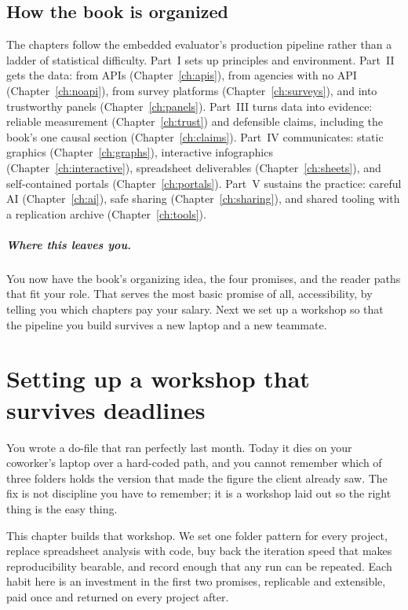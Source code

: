 \documentclass[
    a4paper,
    fontsize=10pt,
    twoside=true,
    numbers=noenddot,
]{kaobook}
\begin{document}
\section{How the book is organized}
The chapters follow the embedded evaluator's production pipeline rather than a ladder of statistical difficulty. Part~I sets up principles and environment. Part~II gets the data: from APIs (Chapter~\ref{ch:apis}), from agencies with no API (Chapter~\ref{ch:noapi}), from survey platforms (Chapter~\ref{ch:surveys}), and into trustworthy panels (Chapter~\ref{ch:panels}). Part~III turns data into evidence: reliable measurement (Chapter~\ref{ch:trust}) and defensible claims, including the book's one causal section (Chapter~\ref{ch:claims}). Part~IV communicates: static graphics (Chapter~\ref{ch:graphs}), interactive infographics (Chapter~\ref{ch:interactive}), spreadsheet deliverables (Chapter~\ref{ch:sheets}), and self-contained portals (Chapter~\ref{ch:portals}). Part~V sustains the practice: careful AI (Chapter~\ref{ch:ai}), safe sharing (Chapter~\ref{ch:sharing}), and shared tooling with a replication archive (Chapter~\ref{ch:tools}).

\paragraph{Where this leaves you.} You now have the book's organizing idea, the four promises, and the reader paths that fit your role. That serves the most basic promise of all, accessibility, by telling you which chapters pay your salary. Next we set up a workshop so that the pipeline you build survives a new laptop and a new teammate.

\chapter{Setting up a workshop that survives deadlines}\label{ch:workshop}

You wrote a do-file that ran perfectly last month. Today it dies on your coworker's laptop over a hard-coded path, and you cannot remember which of three folders holds the version that made the figure the client already saw. The fix is not discipline you have to remember; it is a workshop laid out so the right thing is the easy thing.

This chapter builds that workshop. We set one folder pattern for every project, replace spreadsheet analysis with code, buy back the iteration speed that makes reproducibility bearable, and record enough that any run can be repeated. Each habit here is an investment in the first two promises, replicable and extensible, paid once and returned on every project after.
\end{document}
